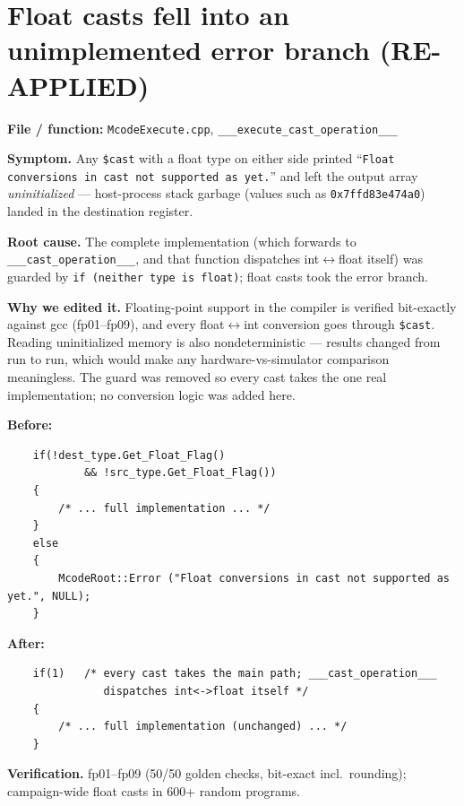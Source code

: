\documentclass[11pt,a4paper]{report}
\begin{document}
\section{Float casts fell into an unimplemented error branch (RE-APPLIED)}

\textbf{File / function:} \texttt{McodeExecute.cpp},
\texttt{\_\_\_execute\_cast\_operation\_\_\_}

\textbf{Symptom.} Any \texttt{\$cast} with a float type on either side printed
``\texttt{Float conversions in cast not supported as yet.}'' and left the
output array \emph{uninitialized} --- host-process stack garbage (values such
as \texttt{0x7ffd83e474a0}) landed in the destination register.

\textbf{Root cause.} The complete implementation (which forwards to
\texttt{\_\_\_cast\_operation\_\_\_}, and that function dispatches
int$\leftrightarrow$float itself) was guarded by
\texttt{if (neither type is float)}; float casts took the error branch.

\textbf{Why we edited it.} Floating-point support in the compiler is verified
bit-exactly against gcc (fp01--fp09), and every float$\leftrightarrow$int
conversion goes through \texttt{\$cast}. Reading uninitialized memory is also
nondeterministic --- results changed from run to run, which would make any
hardware-vs-simulator comparison meaningless. The guard was removed so every
cast takes the one real implementation; no conversion logic was added here.

\textbf{Before:}
\begin{lstlisting}
    if(!dest_type.Get_Float_Flag()
            && !src_type.Get_Float_Flag())
    {
        /* ... full implementation ... */
    }
    else
    {
        McodeRoot::Error ("Float conversions in cast not supported as yet.", NULL);
    }
\end{lstlisting}

\textbf{After:}
\begin{lstlisting}
    if(1)   /* every cast takes the main path; ___cast_operation___
               dispatches int<->float itself */
    {
        /* ... full implementation (unchanged) ... */
    }
\end{lstlisting}

\textbf{Verification.} fp01--fp09 (50/50 golden checks, bit-exact incl.\
rounding); campaign-wide float casts in 600+ random programs.

\end{document}
